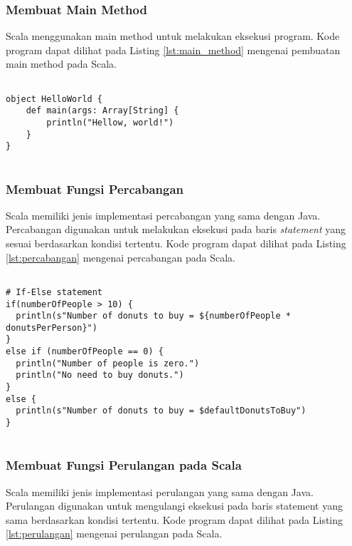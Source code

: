 \subsubsection{Membuat Main Method}
Scala menggunakan main method untuk melakukan eksekusi program. Kode program dapat dilihat pada Listing \ref{lst:main_method} mengenai pembuatan main method pada Scala.

\begin{lstlisting}[basicstyle=\ttfamily, frame=single,
	columns=fullflexible, keepspaces=true, breaklines=true, label=lst:main_method, caption=Membuat Main Method pada Scala]
	
object HelloWorld {
	def main(args: Array[String] {
		println("Hellow, world!")
	}
}
	
\end{lstlisting}

\subsubsection{Membuat Fungsi Percabangan}
Scala memiliki jenis implementasi percabangan yang sama dengan Java. Percabangan digunakan untuk melakukan eksekusi pada baris \textit{statement} yang sesuai berdasarkan kondisi tertentu. Kode program dapat dilihat pada Listing \ref{lst:percabangan} mengenai percabangan pada Scala.

\begin{lstlisting}[basicstyle=\ttfamily, frame=single,
	columns=fullflexible, keepspaces=true, breaklines=true, label=lst:percabangan, caption=Membuat Fungsi Percabangan pada Scala]

# If-Else statement
if(numberOfPeople > 10) { 
  println(s"Number of donuts to buy = ${numberOfPeople * donutsPerPerson}")
}
else if (numberOfPeople == 0) {
  println("Number of people is zero.")
  println("No need to buy donuts.")
} 
else {
  println(s"Number of donuts to buy = $defaultDonutsToBuy")
}
	
\end{lstlisting}

\subsubsection{Membuat Fungsi Perulangan pada Scala}
Scala memiliki jenis implementasi perulangan yang sama dengan Java. Perulangan digunakan untuk mengulangi eksekusi pada baris statement yang sama berdasarkan kondisi tertentu. Kode program dapat dilihat pada Listing \ref{lst:perulangan} mengenai perulangan pada Scala.

